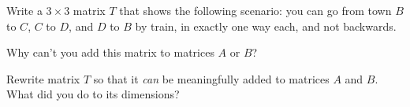 \documentclass[../gatm_answers.tex]{subfiles}
\begin{document}
\begin{outer_problem}
\item Write a $3\times 3$ matrix $T$ that shows the following scenario: you can go from town $B$ to $C$, $C$ to $D$, and $D$ to $B$ by train, in exactly one way each, and not backwards.
\end{outer_problem}

\begin{inner_problem}[start=1]
\item Why can't you add this matrix to matrices $A$ or $B$?
\end{inner_problem}

\begin{inner_problem}
\item Rewrite matrix $T$ so that it \textit{can} be meaningfully added to matrices $A$ and $B$. What did you do to its dimensions?
\end{inner_problem}
\end{document}
